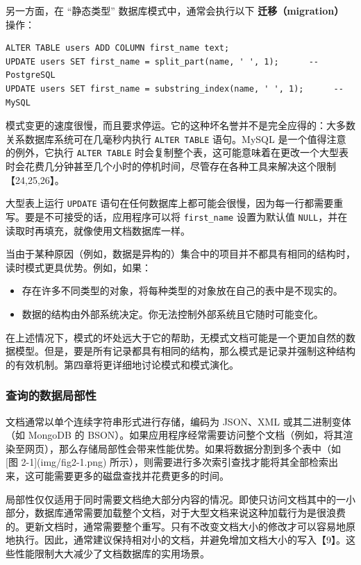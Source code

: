 另一方面，在 “静态类型” 数据库模式中，通常会执行以下 \textbf{迁移（migration）} 操作：

\begin{lstlisting}
ALTER TABLE users ADD COLUMN first_name text;
UPDATE users SET first_name = split_part(name, ' ', 1);      -- PostgreSQL
UPDATE users SET first_name = substring_index(name, ' ', 1);      -- MySQL
\end{lstlisting}

模式变更的速度很慢，而且要求停运。它的这种坏名誉并不是完全应得的：大多数关系数据库系统可在几毫秒内执行 \texttt{ALTER TABLE} 语句。MySQL 是一个值得注意的例外，它执行 \texttt{ALTER TABLE} 时会复制整个表，这可能意味着在更改一个大型表时会花费几分钟甚至几个小时的停机时间，尽管存在各种工具来解决这个限制【24,25,26】。

大型表上运行 \texttt{UPDATE} 语句在任何数据库上都可能会很慢，因为每一行都需要重写。要是不可接受的话，应用程序可以将 \texttt{first\_name} 设置为默认值 \texttt{NULL}，并在读取时再填充，就像使用文档数据库一样。

当由于某种原因（例如，数据是异构的）集合中的项目并不都具有相同的结构时，读时模式更具优势。例如，如果：

\begin{itemize}
    \item 存在许多不同类型的对象，将每种类型的对象放在自己的表中是不现实的。
    \item 数据的结构由外部系统决定。你无法控制外部系统且它随时可能变化。
\end{itemize}

在上述情况下，模式的坏处远大于它的帮助，无模式文档可能是一个更加自然的数据模型。但是，要是所有记录都具有相同的结构，那么模式是记录并强制这种结构的有效机制。第四章将更详细地讨论模式和模式演化。

\subsubsection{查询的数据局部性}

文档通常以单个连续字符串形式进行存储，编码为 JSON、XML 或其二进制变体（如 MongoDB 的 BSON）。如果应用程序经常需要访问整个文档（例如，将其渲染至网页），那么存储局部性会带来性能优势。如果将数据分割到多个表中（如 [图 2-1](img/fig2-1.png) 所示），则需要进行多次索引查找才能将其全部检索出来，这可能需要更多的磁盘查找并花费更多的时间。

局部性仅仅适用于同时需要文档绝大部分内容的情况。即使只访问文档其中的一小部分，数据库通常需要加载整个文档，对于大型文档来说这种加载行为是很浪费的。更新文档时，通常需要整个重写。只有不改变文档大小的修改才可以容易地原地执行。因此，通常建议保持相对小的文档，并避免增加文档大小的写入【9】。这些性能限制大大减少了文档数据库的实用场景。

